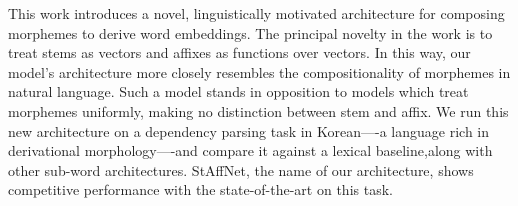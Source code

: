 This work introduces a novel, linguistically motivated architecture for composing morphemes to derive word embeddings. The principal novelty in the work is to treat stems as vectors and affixes as functions over vectors. In this way, our model's architecture more closely resembles the compositionality of morphemes in natural language. Such a model stands in opposition to models which treat morphemes uniformly, making no distinction between stem and affix. We run this new architecture on a dependency parsing task in Korean----a language rich in derivational morphology----and compare it against a lexical baseline,along with other sub-word architectures. StAffNet, the name of our architecture, shows competitive performance with the state-of-the-art on this task.
